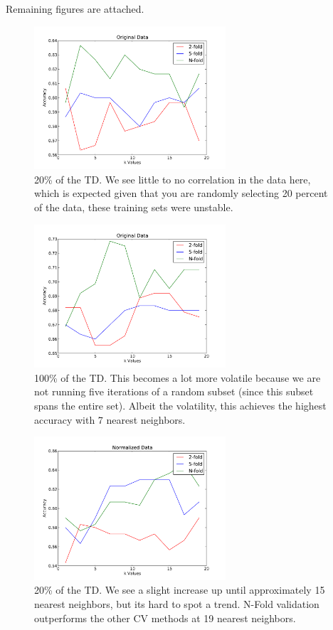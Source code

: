 \documentclass[conference]{acmsiggraph}
\begin{document}
Remaining figures are attached.

\begin{figure}[h]
  \centering
  \includegraphics[width=2.8in]{images/alc_o_20.pdf}
  \caption{20\% of the TD. We see little to no correlation in the data here, which is expected given that you are randomly selecting 20 percent of the data, these training sets were unstable.}
\end{figure}

\begin{figure}[h]
  \centering
  \includegraphics[width=2.8in]{images/alc_o_100.pdf}
  \caption{100\% of the TD. This becomes a lot more volatile because we are not running five iterations of a random subset (since this subset spans the entire set). Albeit the volatility, this achieves the highest accuracy with 7 nearest neighbors.}
\end{figure}

\begin{figure}[h]
  \centering
  \includegraphics[width=2.8in]{images/alc_n_20.pdf}
  \caption{20\% of the TD. We see a slight increase up until approximately 15 nearest neighbors, but its hard to spot a trend. N-Fold validation outperforms the other CV methods at 19 nearest neighbors.}
\end{figure}
\end{document}
